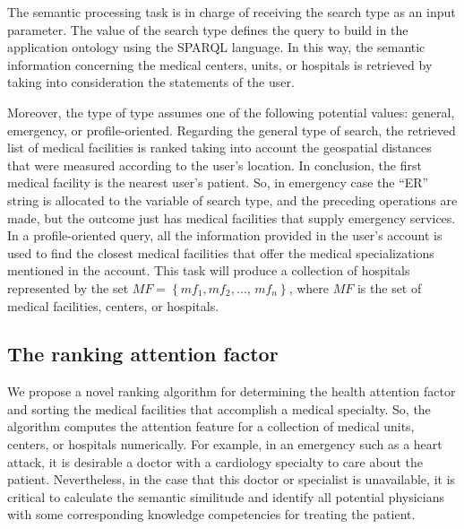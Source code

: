 \documentclass[sustainability,article,submit,pdftex,moreauthors]{Definitions/mdpi}
\begin{document}
The semantic processing task is in charge of receiving the search type as an input parameter. The value of the search type defines the query to build in the application ontology using the SPARQL language. In this way, the semantic information concerning the medical centers, units, or hospitals is retrieved by taking into consideration the statements of the user.

Moreover, the type of type assumes one of the following potential values: general, emergency, or profile-oriented. Regarding the general type of search, the retrieved list of medical facilities is ranked taking into account the geospatial distances that were measured according to the user’s location. In conclusion, the first medical facility is the nearest user's patient. So, in emergency case the “ER” string is allocated to the variable 
 of search type, and the preceding operations are made, but the outcome just has medical facilities that supply emergency services. In a profile-oriented query, all the information provided in the user's account is used to find the closest medical facilities that offer the medical specializations mentioned in the account. This task will produce a collection of hospitals represented by the set $MF=\left\{mf_{1},mf_{2},\dots,\,mf_{n}\right\}$, where $MF$ is the set of medical facilities, centers, or hospitals. 

\subsection{The ranking attention factor}

We propose a novel ranking algorithm for determining the health attention factor and sorting the medical facilities that accomplish a medical specialty. So, the algorithm computes the attention feature for a collection of medical units, centers, or hospitals numerically. For example, in an emergency such as a heart attack, it is desirable a doctor with a cardiology specialty to care about the patient. Nevertheless, in the case that this doctor or specialist is unavailable, it is critical to calculate the semantic similitude and identify all potential physicians with some corresponding knowledge competencies for treating the patient. 
\end{document}
